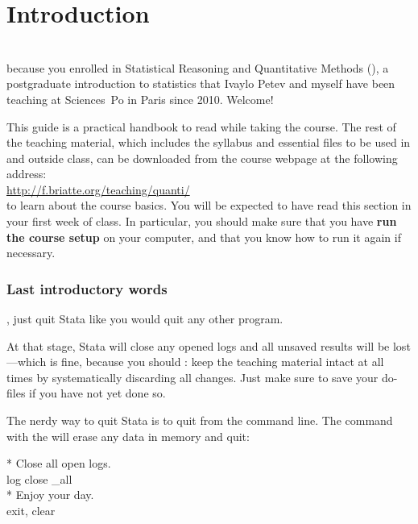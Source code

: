 %
%
\chapter{Introduction}%
	\label{ch:introduction}%

	\\[1em]%
	 because you enrolled in Statistical Reasoning and Quantitative Methods (\SRQM), a postgraduate introduction to statistics that Ivaylo Petev and myself have been teaching at Sciences~Po in Paris since 2010. Welcome!%

	This guide is a practical handbook to read while taking the course. The rest of the teaching material, which includes the syllabus and essential files to be used in and outside class, can be downloaded from the course webpage at the following address:\\[1em]%

		\url{http://f.briatte.org/teaching/quanti/}\\[1em]%
		
	 to learn about the course basics. You will be expected to have read this section in your first week of class. In particular, you should make sure that you have \textbf{run the course setup} on your computer, and that you know how to run it again if necessary.%

	\minitoc
	\newpage

	
	\subsection{Last introductory words}

	, just quit Stata like you would quit any other program.%
	
	At that stage, Stata will close any opened logs and all unsaved results will be lost—which is fine, because you should : keep the teaching material intact at all times by systematically discarding all changes. Just make sure to save your do-files if you have not yet done so.%

	The nerdy way to quit Stata is to quit from the command line. The  command with the  will erase any data in memory and quit:%

		\begin{docspec}
			* Close all open logs.\\%
			log close \_all\\[1em]%
			* Enjoy your day.\\%
			exit, clear
		\end{docspec}
